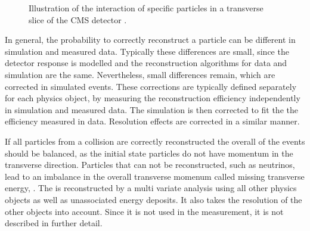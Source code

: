 \begin{figure}[htbp!]
  \begin{center}
\caption{Illustration of the interaction of specific particles in a transverse slice of the CMS detector \cite{Sirunyan:2017ulk}.
  \label{fig:reco_pflow}}
  \end{center}
\end{figure}

In general, the probability to correctly reconstruct a particle can be different in simulation and measured data. Typically these differences are small, since the detector response
is modelled and the reconstruction algorithms for data and simulation are the same. Nevertheless, small differences remain, which are corrected in simulated events.
These corrections are typically defined separately for each physics object, by measuring the reconstruction efficiency independently in simulation and measured data.
The simulation is then corrected to fit the the efficiency measured in data. Resolution effects are corrected in a similar manner.

If all particles from a collision are correctly reconstructed the overall \pt of the events should be balanced, as the initial state particles do not have momentum in the transverse direction.
Particles that can not be reconstructed, such as neutrinos, lead to an imbalance in the overall transverse momenum called missing transverse energy, \ETmiss \cite{CMS-PAS-JME-16-004}.
The \ETmiss is reconstructed by a multi variate analysis using all other physics objects as well as unassociated energy deposits. It also takes the resolution of the other objects into account.
Since it is not used in the measurement, it is not described in further detail.


